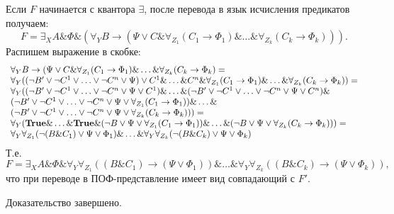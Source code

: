 \documentclass[a4paper,12pt]{article}
\begin{document}
Если $F$ начинается с квантора $\exists$, после перевода в язык исчисления предикатов получаем:
$$F = \exists_X A\&\Phi\&(\forall_Y B\rightarrow (\Psi\vee C\&\forall_{Z_1}(C_1\rightarrow\Phi_1)\&\ldots\&\forall_{Z_k}(C_k\rightarrow\Phi_k))).$$
Распишем выражение в скобке:
$$
\begin{array}{l}
\forall_Y B\rightarrow (\Psi\vee C\&\forall_{Z_1}(C_1\rightarrow\Phi_1)\&\ldots\&\forall_{Z_k}(C_k\rightarrow\Phi_k) =\\
\forall_Y ((\neg B'\vee\neg C^1\vee\ldots\vee\neg C^n\vee\Psi) \vee C^1\&\ldots\& C^n\&\forall_{Z_1}(C_1\rightarrow\Phi_1)\&\ldots\&\forall_{Z_k}(C_k\rightarrow\Phi_k)) =\\
\forall_Y ((\neg B'\vee\neg C^1\vee\ldots\vee\neg C^n\vee\Psi\vee C^1)\&\ldots\&(\neg B'\vee\neg C^1\vee\ldots\vee\neg C^n\vee\Psi\vee C^n)\&\\
(\neg B'\vee\neg C^1\vee\ldots\vee\neg C^n\vee\Psi\vee\forall_{Z_1}(C_1\rightarrow\Phi_1) )\&\ldots\&\\
(\neg B'\vee\neg C^1\vee\ldots\vee\neg C^n\vee\Psi\vee\forall_{Z_k}(C_k\rightarrow\Phi_k) )) = \\
\forall_Y (\text{\textbf{True}}\&\ldots\&\text{\textbf{True}}\&(\neg B\vee\Psi\vee\forall_{Z_1}(C_1\rightarrow\Phi_1) )\&\ldots\&(\neg B\vee\Psi\vee\forall_{Z_k}(C_k\rightarrow\Phi_k) )) = \\
\forall_Y\forall_{Z_1}(\neg(B\& C_1)\vee\Psi\vee\Phi_1)\&\ldots\&\forall_Y\forall_{Z_k}(\neg(B\& C_k)\vee\Psi\vee\Phi_k)
\end{array}
$$
Т.е. $$F = \exists_X A\&\Phi\&\forall_Y\forall_{Z_1}((B\& C_1)\rightarrow(\Psi\vee\Phi_1))\&\ldots\&\forall_Y\forall_{Z_k}((B\& C_k)\rightarrow(\Psi\vee\Phi_k)),$$
что при переводе в ПОФ-представление имеет вид совпадающий с $F'$.

Доказательство завершено.
\end{document}

